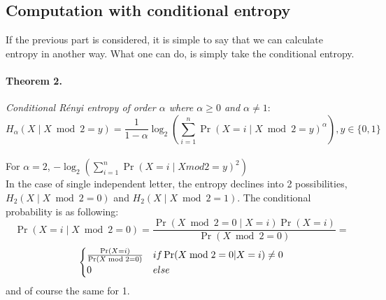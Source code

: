 \documentclass{article}
\begin{document}
\subsection{Computation with conditional entropy}
If the previous part is considered, it is simple to say that we can calculate entropy in another way. What one can do, is simply take the conditional entropy.\\
\paragraph{Theorem 2.}\textit{Conditional R\'enyi entropy of order $\alpha$ where $\alpha \geq 0$ and $\alpha \neq 1$}:
$$H_{\alpha}(X \mid X \bmod 2 = y) = \frac{1}{1-\alpha}\log_{2}(\sum_{i=1}^{n}{\Pr(X=i \mid X \bmod 2= y )^{\alpha}}) , y \in \{0,1\} $$\\
For $\alpha = 2$, $-\log_{2}(\sum_{i=1}^{n}{\Pr (X=i \mid X mod2 = y)^{2}})$\\
In the case of single independent letter, the entropy declines into 2 possibilities, $H_{2}(X \mid X \bmod 2 = 0) $ and $H_{2}(X \mid X \bmod 2 = 1)$. The conditional probability is as following:
$$\Pr (X=i \mid X \bmod 2 = 0 ) = \frac{\Pr(X \bmod 2 = 0 \mid X = i) \Pr(X=i)}{\Pr(X \bmod 2 =0)} = $$
\[ \begin{cases}
      \frac{\Pr(X=i)}{\Pr(X \bmod 2 =0)} $$ & if \Pr(X \bmod 2 =0| X=i) \neq 0 \\
      0 & else
   \end{cases}
\]
and of course the same for 1.\\
\end{document}
